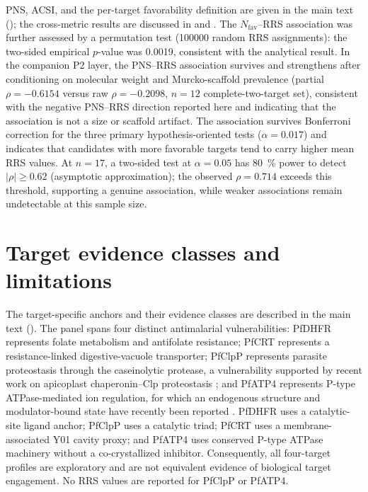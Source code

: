 \documentclass[journal=jcisd8,manuscript=suppinfo]{achemso}
\begin{document}
PNS, ACSI, and the per-target favorability definition are given in the main text (); the cross-metric results are discussed in  and . The $N_{\mathrm{fav}}$--RRS association was further assessed by a permutation test (\num{100000} random RRS assignments): the two-sided empirical $p$-value was \num{0.0019}, consistent with the analytical result. In the companion P2 layer, the PNS--RRS association survives and strengthens after conditioning on molecular weight and Murcko-scaffold prevalence (partial $\rho=-\num{0.6154}$ versus raw $\rho=-\num{0.2098}$, $n=\num{12}$ complete-two-target set), consistent with the negative PNS--RRS direction reported here and indicating that the association is not a size or scaffold artifact. The association survives Bonferroni correction for the three primary hypothesis-oriented tests ($\alpha=\num{0.017}$) and indicates that candidates with more favorable targets tend to carry higher mean RRS values. At $n=\num{17}$, a two-sided test at $\alpha=\num{0.05}$ has \qty{80}{\percent} power to detect $|\rho|\geq\num{0.62}$ (asymptotic approximation); the observed $\rho=\num{0.714}$ exceeds this threshold, supporting a genuine association, while weaker associations remain undetectable at this sample size.



\section{Target evidence classes and limitations}\label{sec:sm_evidence}
The target-specific anchors and their evidence classes are described in the main text (). The panel spans four distinct antimalarial vulnerabilities: PfDHFR represents folate metabolism and antifolate resistance; PfCRT represents a resistance-linked digestive-vacuole transporter; PfClpP represents parasite proteostasis through the caseinolytic protease, a vulnerability supported by recent work on apicoplast chaperonin--Clp proteostasis \cite{Tissawak2025}; and PfATP4 represents P-type ATPase-mediated ion regulation, for which an endogenous structure and modulator-bound state have recently been reported \cite{Haile2025}. PfDHFR uses a catalytic-site ligand anchor; PfClpP uses a catalytic triad; PfCRT uses a membrane-associated Y01 cavity proxy; and PfATP4 uses conserved P-type ATPase machinery without a co-crystallized inhibitor. Consequently, all four-target profiles are exploratory and are not equivalent evidence of biological target engagement. No RRS values are reported for PfClpP or PfATP4.
\end{document}

